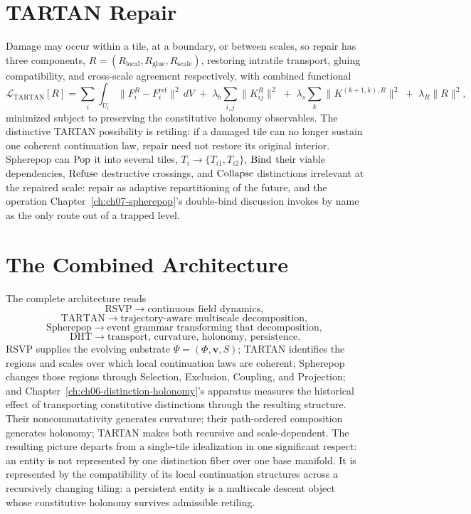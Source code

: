 \section{TARTAN Repair}

Damage may occur within a tile, at a boundary, or between scales, so repair has three components, $R = (R_{\mathrm{local}}, R_{\mathrm{glue}}, R_{\mathrm{scale}})$, restoring intratile transport, gluing compatibility, and cross-scale agreement respectively, with combined functional
\[
\mathcal{L}_{\mathrm{TARTAN}}[R] = \sum_i \int_{U_i} \|F_i^R - F_i^{\mathrm{ref}}\|^2\, dV \;+\; \lambda_b \sum_{i,j} \|K_{ij}^R\|^2 \;+\; \lambda_s \sum_k \|K^{(k+1,k),R}\|^2 \;+\; \lambda_R \|R\|^2,
\]
minimized subject to preserving the constitutive holonomy observables. The distinctive TARTAN possibility is retiling: if a damaged tile can no longer sustain one coherent continuation law, repair need not restore its original interior. Spherepop can $\mathrm{Pop}$ it into several tiles, $T_i \to \{T_{i1}, T_{i2}\}$, $\mathrm{Bind}$ their viable dependencies, $\mathrm{Refuse}$ destructive crossings, and $\mathrm{Collapse}$ distinctions irrelevant at the repaired scale: repair as adaptive repartitioning of the future, and the operation Chapter~\ref{ch:ch07-spherepop}'s double-bind discussion invokes by name as the only route out of a trapped level.

\section{The Combined Architecture}

The complete architecture reads
\[
\text{RSVP} \to \text{continuous field dynamics},
\]
\[
\text{TARTAN} \to \text{trajectory-aware multiscale decomposition},
\]
\[
\text{Spherepop} \to \text{event grammar transforming that decomposition},
\]
\[
\text{DHT} \to \text{transport, curvature, holonomy, persistence}.
\]
RSVP supplies the evolving substrate $\Psi = (\Phi,\mathbf{v},S)$; TARTAN identifies the regions and scales over which local continuation laws are coherent; Spherepop changes those regions through Selection, Exclusion, Coupling, and Projection; and Chapter~\ref{ch:ch06-distinction-holonomy}'s apparatus measures the historical effect of transporting constitutive distinctions through the resulting structure. Their noncommutativity generates curvature; their path-ordered composition generates holonomy; TARTAN makes both recursive and scale-dependent. The resulting picture departs from a single-tile idealization in one significant respect: an entity is not represented by one distinction fiber over one base manifold. It is represented by the compatibility of its local continuation structures across a recursively changing tiling: a persistent entity is a multiscale descent object whose constitutive holonomy survives admissible retiling.

